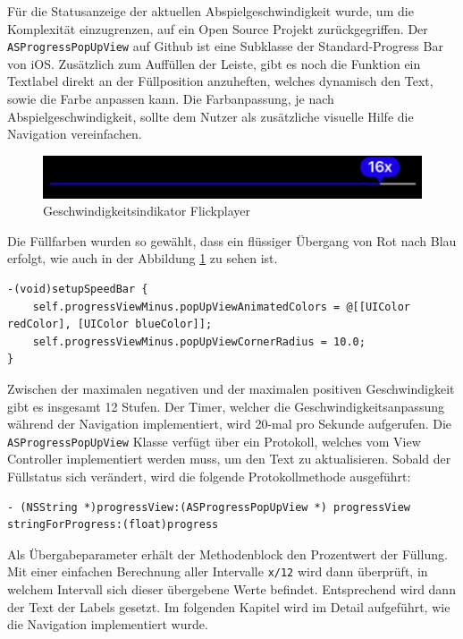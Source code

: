 \documentclass[11pt,a4paper]{report}
\begin{document}
Für die Statusanzeige der aktuellen Abspielgeschwindigkeit wurde, um die Komplexität einzugrenzen, auf ein Open Source Projekt zurückgegriffen. Der \texttt{AS\-Progress\-Pop\-Up\-View} auf Github ist eine Subklasse der Standard-Progress Bar von iOS. Zusätzlich zum Auffüllen der Leiste, gibt es noch die Funktion ein Textlabel direkt an der Füllposition anzuheften, welches dynamisch den Text, sowie die Farbe anpassen kann. Die Farbanpassung, je nach Abspielgeschwindigkeit, sollte dem Nutzer als zusätzliche visuelle Hilfe die Navigation vereinfachen.
\begin{figure}[h]
\begin{center}
\includegraphics[scale=1]{./images/27.png}
\caption{Geschwindigkeitsindikator Flickplayer}
\label{flickplayer_indikator}
\end{center}
\end{figure}
Die Füllfarben wurden so gewählt, dass ein flüssiger Übergang von Rot nach Blau erfolgt, wie auch in der Abbildung \ref{flickplayer_indikator} zu sehen ist.
\begin{lstlisting}
-(void)setupSpeedBar {
	self.progressViewMinus.popUpViewAnimatedColors = @[[UIColor redColor], [UIColor blueColor]];
	self.progressViewMinus.popUpViewCornerRadius = 10.0;
}
\end{lstlisting}
Zwischen der maximalen negativen und der maximalen positiven Geschwindigkeit gibt es insgesamt 12 Stufen. Der Timer, welcher die Geschwindigkeitsanpassung während der Navigation implementiert, wird 20-mal pro Sekunde aufgerufen. Die \texttt{AS\-Progress\-Pop\-Up\-View} Klasse verfügt über ein Protokoll, welches vom View Controller implementiert werden muss, um den Text zu aktualisieren. Sobald der Füllstatus sich verändert, wird die folgende Protokollmethode ausgeführt:
\begin{lstlisting}
- (NSString *)progressView:(ASProgressPopUpView *) progressView stringForProgress:(float)progress 
\end{lstlisting}
Als Übergabeparameter erhält der Methodenblock den Prozentwert der Füllung. Mit einer einfachen Berechnung aller Intervalle \texttt{x/12} wird dann überprüft, in welchem Intervall sich dieser übergebene Werte befindet. Entsprechend wird dann der Text der Labels gesetzt. \cite{ASProgressPopUpViewRepository}
Im folgenden Kapitel wird im Detail aufgeführt, wie die Navigation implementiert wurde.
\end{document}
